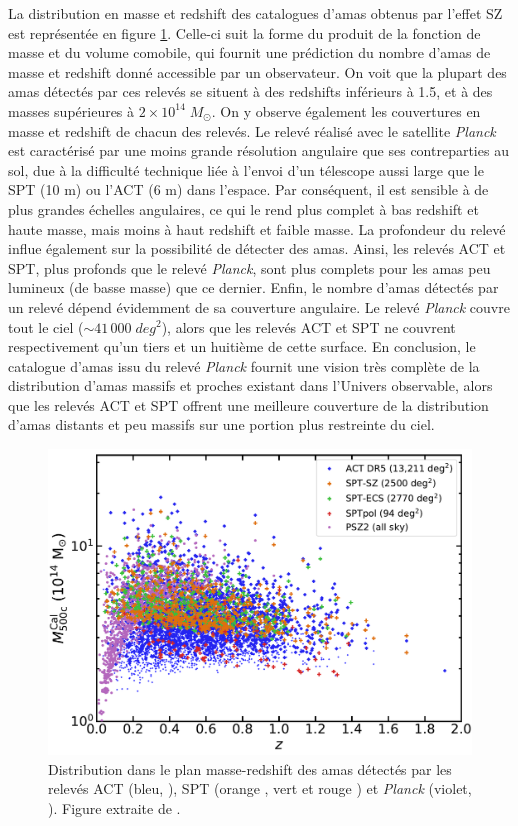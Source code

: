 La distribution en masse et redshift des catalogues d'amas obtenus par l'effet SZ est représentée en figure \ref{fig:cluster_catalogs_mz}.
Celle-ci suit la forme du produit de la fonction de masse et du volume comobile, qui fournit une prédiction du nombre d'amas de masse et redshift donné accessible par un observateur\footnotemark.
On voit que la plupart des amas détectés par ces relevés se situent à des redshifts inférieurs à 1.5, et à des masses supérieures à $2 \times 10^{14} \;M_\odot$.
On y observe également les couvertures en masse et redshift de chacun des relevés.
Le relevé réalisé avec le satellite \textit{Planck} est caractérisé par une moins grande résolution angulaire que ses contreparties au sol, due à la difficulté technique liée à l'envoi d'un télescope aussi large que le SPT (10 m) ou l'ACT (6 m) dans l'espace.
Par conséquent, il est sensible à de plus grandes échelles angulaires, ce qui le rend plus complet à bas redshift et haute masse, mais moins à haut redshift et faible masse.
La profondeur du relevé influe également sur la possibilité de détecter des amas.
Ainsi, les relevés ACT et SPT, plus profonds que le relevé \textit{Planck}, sont plus complets pour les amas peu lumineux (de basse masse) que ce dernier.
Enfin, le nombre d'amas détectés par un relevé dépend évidemment de sa couverture angulaire.
Le relevé \textit{Planck} couvre tout le ciel ($\sim 41\,000 \;\unit{deg^2}$), alors que les relevés ACT et SPT ne couvrent respectivement qu'un tiers et un huitième de cette surface.
En conclusion, le catalogue d'amas issu du relevé \textit{Planck} fournit une vision très complète de la distribution d'amas massifs et proches existant dans l'Univers observable, alors que les relevés ACT et SPT offrent une meilleure couverture de la distribution d'amas distants et peu massifs sur une portion plus restreinte du ciel.

\begin{figure}[t]
    \centering
    \includegraphics[width=.6\textwidth]{Figures/Chap_amas/mz_sz.pdf}
    \caption{
        Distribution dans le plan masse-redshift des amas détectés par les relevés ACT (bleu, \cite{hilton_atacama_2021}), SPT (orange \cite{bleem_galaxy_2015}, vert \cite{bleem_sptpol_2020} et rouge \cite{huang_galaxy_2020}) et \textit{Planck} (violet, \cite{planck_collaboration_planck_2016-1}).
        Figure extraite de \cite{hilton_atacama_2021}.
    }
    \label{fig:cluster_catalogs_mz}
\end{figure}

